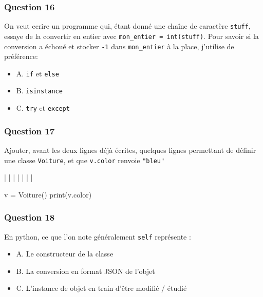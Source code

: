 \documentclass[
]{article}
\newenvironment{Shaded}{}{}
\newcommand{\BuiltInTok}[1]{#1}
\newcommand{\NormalTok}[1]{#1}
\newcommand{\OperatorTok}[1]{\textcolor[rgb]{0.40,0.40,0.40}{#1}}
\providecommand{\tightlist}{%
  \setlength{\itemsep}{0pt}\setlength{\parskip}{0pt}}
\begin{document}
\hypertarget{question-16}{%
\subsubsection{Question 16}\label{question-16}}

On veut ecrire un programme qui, étant donné une chaîne de caractère
\texttt{stuff}, essaye de la convertir en entier avec
\texttt{mon\_entier\ =\ int(stuff)}. Pour savoir si la conversion a
échoué et stocker \texttt{-1} dans \texttt{mon\_entier} à la place,
j'utilise de préférence:

\begin{itemize}
\tightlist
\item
  A. \texttt{if} et \texttt{else}
\item
  B. \texttt{isinstance}
\item
  C. \texttt{try} et \texttt{except}
\end{itemize}

\hypertarget{question-17}{%
\subsubsection{Question 17}\label{question-17}}

Ajouter, avant les deux lignes déjà écrites, quelques lignes permettant
de définir une classe \texttt{Voiture}, et que \texttt{v.color} renvoie
\texttt{"bleu"}

\begin{Shaded}
\begin{Highlighting}[]
\OperatorTok{|}
\OperatorTok{|}
\OperatorTok{|}
\OperatorTok{|}
\OperatorTok{|}
\OperatorTok{|}
\OperatorTok{|}

\NormalTok{v }\OperatorTok{=}\NormalTok{ Voiture()}
\BuiltInTok{print}\NormalTok{(v.color)}
\end{Highlighting}
\end{Shaded}

\hypertarget{question-18}{%
\subsubsection{Question 18}\label{question-18}}

En python, ce que l'on note généralement \texttt{self} représente :

\begin{itemize}
\tightlist
\item
  A. Le constructeur de la classe
\item
  B. La conversion en format JSON de l'objet
\item
  C. L'instance de objet en train d'être modifié / étudié
\end{itemize}
\end{document}
